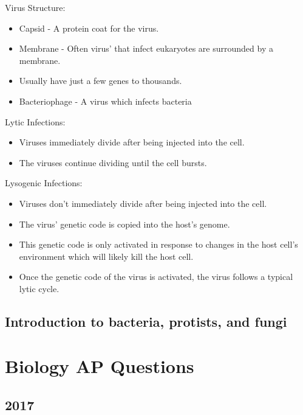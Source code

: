 \documentclass{article}
\begin{document}
Virus Structure:
\begin{itemize}
\item Capsid - A protein coat for the virus.
\item Membrane - Often virus' that infect eukaryotes are surrounded by a membrane.
\item Usually have just a few genes to thousands.
\item Bacteriophage - A virus which infects bacteria
\end{itemize}
Lytic Infections:
\begin{itemize}
\item Viruses immediately divide after being injected into the cell.
\item The viruses continue dividing until the cell bursts.
\end{itemize}
Lysogenic Infections:
\begin{itemize}
\item Viruses don't immediately divide after being injected into the cell.
\item The virus' genetic code is copied into the host's genome.
\item This genetic code is only activated in response to changes in the host cell's environment which will likely kill the 
host cell.
\item Once the genetic code of the virus is activated, the virus follows a typical lytic cycle.
\end{itemize}

\subsection{Introduction to bacteria, protists, and fungi}

\section{Biology AP Questions}

\subsection{2017}
\end{document}
